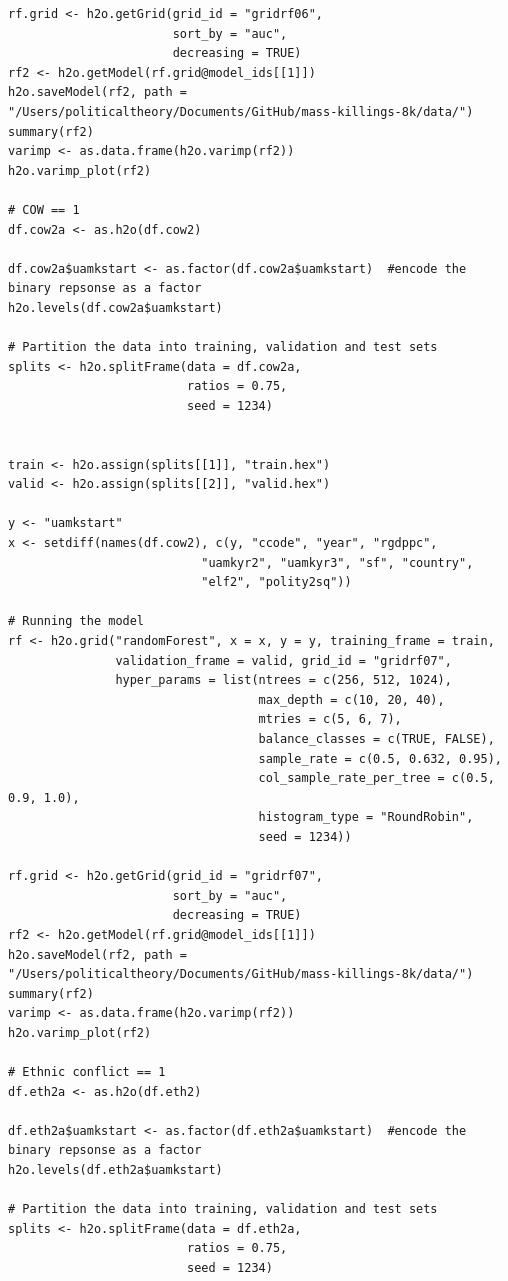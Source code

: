 \documentclass[a4paper,12pt]{article}
\begin{document}
\begin{verbatim}
rf.grid <- h2o.getGrid(grid_id = "gridrf06",
                       sort_by = "auc",
                       decreasing = TRUE)
rf2 <- h2o.getModel(rf.grid@model_ids[[1]])
h2o.saveModel(rf2, path = "/Users/politicaltheory/Documents/GitHub/mass-killings-8k/data/")
summary(rf2)
varimp <- as.data.frame(h2o.varimp(rf2))
h2o.varimp_plot(rf2)

# COW == 1
df.cow2a <- as.h2o(df.cow2)

df.cow2a$uamkstart <- as.factor(df.cow2a$uamkstart)  #encode the binary repsonse as a factor
h2o.levels(df.cow2a$uamkstart)

# Partition the data into training, validation and test sets
splits <- h2o.splitFrame(data = df.cow2a, 
                         ratios = 0.75,  
                         seed = 1234)  


train <- h2o.assign(splits[[1]], "train.hex")   
valid <- h2o.assign(splits[[2]], "valid.hex") 

y <- "uamkstart"
x <- setdiff(names(df.cow2), c(y, "ccode", "year", "rgdppc",
                           "uamkyr2", "uamkyr3", "sf", "country",
                           "elf2", "polity2sq")) 

# Running the model
rf <- h2o.grid("randomForest", x = x, y = y, training_frame = train, 
               validation_frame = valid, grid_id = "gridrf07",
               hyper_params = list(ntrees = c(256, 512, 1024),
                                   max_depth = c(10, 20, 40),
                                   mtries = c(5, 6, 7),
                                   balance_classes = c(TRUE, FALSE),
                                   sample_rate = c(0.5, 0.632, 0.95),
                                   col_sample_rate_per_tree = c(0.5, 0.9, 1.0),
                                   histogram_type = "RoundRobin",
                                   seed = 1234)) 

rf.grid <- h2o.getGrid(grid_id = "gridrf07",
                       sort_by = "auc",
                       decreasing = TRUE)
rf2 <- h2o.getModel(rf.grid@model_ids[[1]])
h2o.saveModel(rf2, path = "/Users/politicaltheory/Documents/GitHub/mass-killings-8k/data/")
summary(rf2)
varimp <- as.data.frame(h2o.varimp(rf2))
h2o.varimp_plot(rf2)

# Ethnic conflict == 1
df.eth2a <- as.h2o(df.eth2)

df.eth2a$uamkstart <- as.factor(df.eth2a$uamkstart)  #encode the binary repsonse as a factor
h2o.levels(df.eth2a$uamkstart)

# Partition the data into training, validation and test sets
splits <- h2o.splitFrame(data = df.eth2a, 
                         ratios = 0.75, 
                         seed = 1234) 



\end{verbatim}
\end{document}
